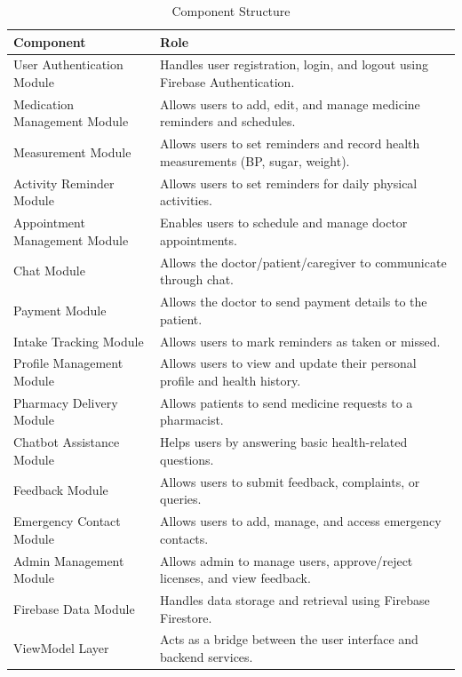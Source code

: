 \documentclass[12pt, a4paper, oneside]{report}
\begin{document}
\begin{table}[H]
\centering
\caption{Component Structure}
\label{tab:components}
\begin{tabularx}{\textwidth}{|l|X|}
\hline
\textbf{Component} & \textbf{Role} \\ \hline
User Authentication Module & Handles user registration, login, and logout using Firebase Authentication. \\ \hline
Medication Management Module & Allows users to add, edit, and manage medicine reminders and schedules. \\ \hline
Measurement Module & Allows users to set reminders and record health measurements (BP, sugar, weight). \\ \hline
Activity Reminder Module & Allows users to set reminders for daily physical activities. \\ \hline
Appointment Management Module & Enables users to schedule and manage doctor appointments. \\ \hline
Chat Module & Allows the doctor/patient/caregiver to communicate through chat. \\ \hline
Payment Module & Allows the doctor to send payment details to the patient. \\ \hline
Intake Tracking Module & Allows users to mark reminders as taken or missed. \\ \hline
Profile Management Module & Allows users to view and update their personal profile and health history. \\ \hline
Pharmacy Delivery Module & Allows patients to send medicine requests to a pharmacist. \\ \hline
Chatbot Assistance Module & Helps users by answering basic health-related questions. \\ \hline
Feedback Module & Allows users to submit feedback, complaints, or queries. \\ \hline
Emergency Contact Module & Allows users to add, manage, and access emergency contacts. \\ \hline
Admin Management Module & Allows admin to manage users, approve/reject licenses, and view feedback. \\ \hline
Firebase Data Module & Handles data storage and retrieval using Firebase Firestore. \\ \hline
ViewModel Layer & Acts as a bridge between the user interface and backend services. \\ \hline
\end{tabularx}
\end{table}
\end{document}
